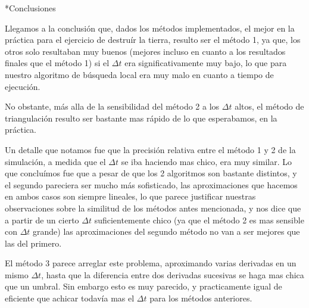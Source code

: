 \documentclass[12pt,titlepage]{article}
\begin{document}
	\begin{section}*{Conclusiones}	

		Llegamos a la conclusión que, dados los métodos implementados,
		el mejor en la práctica para el ejercicio de destruír la tierra, resulto ser el método 1, ya que,
		los otros solo resultaban muy buenos (mejores incluso en cuanto a los resultados finales que el método 1)
		si el $\Delta t$ era significativamente muy bajo,
		lo que para nuestro algoritmo de búsqueda local era muy malo en cuanto a tiempo de ejecución.

		No obstante, más alla de la sensibilidad del método 2 a los $\Delta t$ altos,
		el método de triangulación resulto ser bastante mas rápido de lo que esperabamos, en la práctica.

		Un detalle que notamos fue que la precisión relativa entre el método 1 y 2 de la simulación, a medida que el $\Delta t$ se iba haciendo mas chico,
		era muy similar. Lo que concluímos fue que a pesar de que los 2 algoritmos son bastante distintos,
		y el segundo pareciera ser mucho más sofisticado, las aproximaciones que hacemos en ambos casos son siempre lineales,
		lo que parece justificar nuestras observaciones sobre la similitud de los métodos antes mencionada,
		y nos dice que a partir de un cierto $\Delta t$ suficientemente chico (ya que el método 2 es mas sensible con $\Delta t$ grande) las aproximaciones del segundo método
		no van a ser mejores que las del primero.

		El método 3 parece arreglar este problema, aproximando varias derivadas en un mismo $\Delta t$,
		hasta que la diferencia entre dos derivadas sucesivas se haga mas chica que un umbral.
		Sin embargo esto es muy parecido, y practicamente igual de eficiente que achicar todavía mas el $\Delta t$ para los métodos anteriores.

	\end{section}
	
\end{document}
